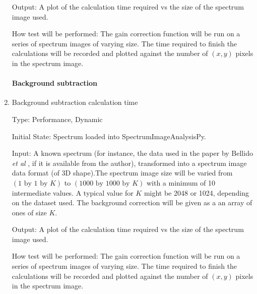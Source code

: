 \documentclass[12pt, titlepage]{article}
\newcommand{\progname}{SpectrumImageAnalysisPy}
\begin{document}
\begin{enumerate}
Output: A plot of the calculation time required vs the size of the spectrum
image used.

How test will be performed: The gain correction function will be run on a series
of spectrum images of varying size. The time required to finish the calculations
will be recorded and plotted against the number of $(x, y)$ pixels in the
spectrum image.\\

\paragraph{Background subtraction}
\item{Background subtraction calculation time}

Type: Performance, Dynamic

Initial State: Spectrum loaded into \progname{}.

Input: A known spectrum (for instance, the data used in the paper by
Bellido \textit{et al} \cite{bellido_toward_2014}, if it is available
from the author), transformed into a spectrum image data format (of 3D
shape).The spectrum image size will be varied from
$(1\text{ by }1\text{ by }K)$ to
$(1000 \text{ by } 1000 \text{ by }K)$ with a minimum of 10
intermediate values. A typical value for $K$ might be 2048 or 1024,
depending on the dataset used. The background correction will be given
as a an array of ones of size $K$.

Output: A plot of the calculation time required vs the size of the spectrum
image used.

How test will be performed: The gain correction function will be run on a series
of spectrum images of varying size. The time required to finish the calculations
will be recorded and plotted against the number of $(x, y)$ pixels in the
spectrum image.\\

\end{enumerate}

\end{document}

